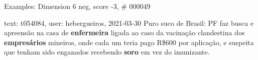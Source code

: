 \begin{frame}{Examples: Dimension 6 neg, score -3, \# 000049}
\footnotesize
\begin{alertblock}{text: t054084, user: hebergueiros, 2021-03-30}
Puro suco de Brasil: PF faz busca e apreensão na casa de \textbf{enfermeira} 
ligada ao caso da vacinação clandestina dos \textbf{empresários} mineiros, onde 
cada um teria pago R\$600 por aplicação, e suspeita que tenham sido enganados 
recebendo \textbf{soro} em vez do imunizante. 
\end{alertblock}
\end{frame}
